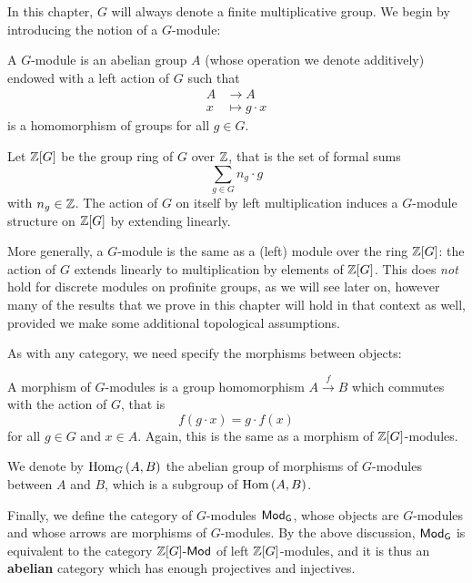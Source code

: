 \documentclass[a4paper, oneside]{memoir}
\begin{document}
In this chapter, $G$ will always denote a finite multiplicative group. We begin by introducing the notion of a $G$-module:

\begin{definition}
	A $G$-module is an abelian group $A$ (whose operation we denote additively) endowed with a left action of $G$ such that
	\begin{align*}
		A & \longrightarrow A    \\
		x & \longmapsto g\cdot x
	\end{align*}
	is a homomorphism of groups for all $g\in G$.
\end{definition}

\begin{remark}
	Let $\mathbb{Z}[G]$ be the group ring of $G$ over $\mathbb{Z}$, that is the set of formal sums
	\[
		\sum_{g\in G}{n_g\cdot g}
	\]
	with $n_g\in\mathbb{Z}$. The action of $G$ on itself by left multiplication induces a $G$-module structure on $\mathbb{Z}[G]$ by extending linearly.

	More generally, a $G$-module is the same as a (left) module over the ring $\mathbb{Z}[G]$: the action of $G$ extends linearly to multiplication by elements of $\mathbb{Z}[G]$. This does \textit{not} hold for discrete modules on profinite groups, as we will see later on, however many of the results that we prove in this chapter will hold in that context as well, provided we make some additional topological assumptions.
\end{remark}

As with any category, we need specify the morphisms between objects:

\begin{definition}
	A morphism of $G$-modules is a group homomorphism $A\overset{f}{\to} B$ which commutes with the action of $G$, that is
	\[
		f(g\cdot x)=g\cdot f(x)
	\]
	for all $g\in G$ and $x\in A$. Again, this is the same as a morphism of $\mathbb{Z}[G]$-modules.
\end{definition}
\noindent We denote by $\operatorname{Hom}_G{(A,B)}$ the abelian group of morphisms of $G$-modules between $A$ and $B$, which is a subgroup of $\operatorname{Hom}{(A,B)}$.

\medskip Finally, we define the category of $G$-modules $\mathsf{Mod}_\mathsf{G}$, whose objects are $G$-modules and whose arrows are morphisms of $G$-modules. By the above discussion, $\mathsf{Mod}_\mathsf{G}$ is equivalent to the category $\mathbb{Z}[G]\text{-}\mathsf{Mod}$ of left $\mathbb{Z}[G]$-modules, and it is thus an \textbf{abelian} category which has enough projectives and injectives.
\end{document}
